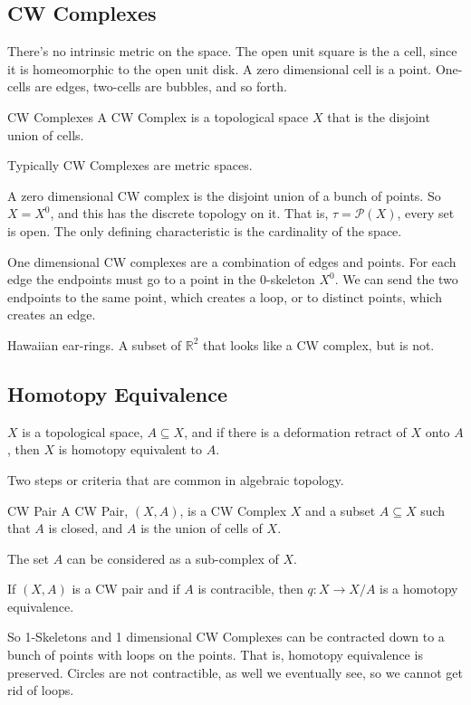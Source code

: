 \documentclass{book}                                                           %
\begin{document}
    \subsection{CW Complexes}
        There's no intrinsic metric on the space.
        The open unit square is the a cell, since
        it is homeomorphic to the open unit disk.
        A zero dimensional cell is a point.
        One-cells are edges, two-cells are
        bubbles, and so forth.
        \begin{ldefinition}{CW Complexes}
            A CW Complex is a topological space $X$ that is the disjoint union
            of cells.
        \end{ldefinition}
        Typically CW Complexes are metric spaces.
        \begin{example}
            A zero dimensional CW complex is the disjoint union of a bunch of
            points. So $X=X^{0}$, and this has the discrete topology on it. That
            is, $\tau=\mathcal{P}(X)$, every set is open. The only defining
            characteristic is the cardinality of the space.
        \end{example}
        \begin{example}
            One dimensional CW complexes are a combination of edges and points.
            For each edge the endpoints must go to a point in the 0-skeleton
            $X^{0}$. We can send the two endpoints to the same point, which
            creates a loop, or to distinct points, which creates an edge.
        \end{example}
        \begin{example}
            Hawaiian ear-rings. A subset of $\mathbb{R}^{2}$ that looks like a
            CW complex, but is not.
        \end{example}
    \subsection{Homotopy Equivalence}
        \begin{theorem}
            $X$ is a topological space, $A\subseteq{X}$, and
            if there is a deformation retract of $X$ onto
            $A$, then $X$ is homotopy equivalent to $A$.
        \end{theorem}
        Two steps or criteria that are common in algebraic
        topology.
        \begin{ldefinition}{CW Pair}
            A CW Pair, $(X,A)$, is a CW Complex $X$ and a
            subset $A\subseteq{X}$ such that $A$ is closed,
            and $A$ is the union of cells of $X$.
        \end{ldefinition}
        The set $A$ can be considered as a sub-complex
        of $X$.
        \begin{theorem}
            If $(X,A)$ is a CW pair and if $A$ is
            contracible, then $q:X\rightarrow{X}/A$
            is a homotopy equivalence.
        \end{theorem}
        So 1-Skeletons and 1 dimensional CW Complexes can
        be contracted down to a bunch of points with loops
        on the points. That is, homotopy equivalence is
        preserved. Circles are not contractible, as well
        we eventually see, so we cannot get rid of loops.
\end{document}
